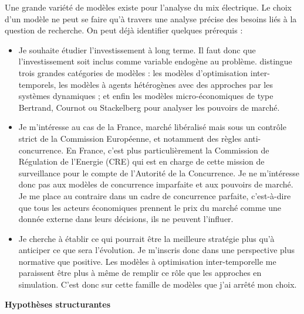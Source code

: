 Une grande variété de modèles existe pour l’analyse du mix électrique. Le choix d’un modèle ne peut se faire qu’à travers une analyse précise des besoins liés à la question de recherche.
On peut déjà identifier quelques prérequis :
\begin{itemize}
	\item Je souhaite étudier l’investissement à long terme. Il faut donc que l’investissement soit inclus comme variable endogène au problème. \citet{Petitet2016} distingue trois grandes catégories de modèles : les modèles d’optimisation inter-temporels, les modèles à agents hétérogènes avec des approches par les systèmes dynamiques ; et enfin les modèles micro-économiques de type Bertrand, Cournot ou Stackelberg pour analyser les pouvoirs de marché. 
	\item Je m’intéresse au cas de la France, marché libéralisé mais sous un contrôle strict de la Commission Européenne, et notamment des règles anti-concurrence. En France, c’est plus particulièrement la Commission de Régulation de l’Energie (CRE) qui est en charge de cette mission de surveillance pour le compte de l'Autorité de la Concurrence. Je ne m’intéresse donc pas aux modèles de concurrence imparfaite et aux pouvoirs de marché. Je me place au contraire dans un cadre de concurrence parfaite, c’est-à-dire que tous les acteurs économiques prennent le prix du marché comme une donnée externe dans leurs décisions, ils ne peuvent l’influer. 
	\item Je cherche à établir ce qui pourrait être la meilleure stratégie plus qu’à anticiper ce que sera l’évolution. Je m’inscris donc dans une perspective plus normative que positive. Les modèles à optimisation inter-temporelle me paraissent être plus à même de remplir ce rôle que les approches en simulation. C’est donc sur cette famille de modèles que j’ai arrêté mon choix.
\end{itemize}

\textbf{Hypothèses structurantes}

